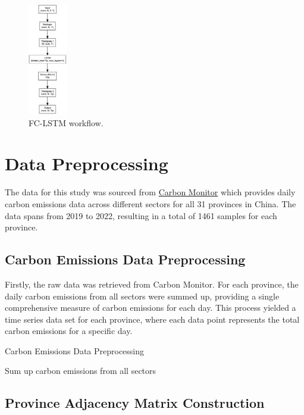 \documentclass[sigconf, authordraft]{acmart}
\begin{document}
	\begin{figure}[ht]
		\centering
		\includegraphics[width=0.15\textwidth]{figures/FC-LSTM_flow.png}
		\caption{FC-LSTM workflow.}
		\label{fig:FC-LSTM_flow}
	\end{figure}

	\section{Data Preprocessing}


	The data for this study was sourced from  \href{https://cn.carbonmonitor.org/}{Carbon Monitor} which provides daily carbon emissions data across different sectors for all 31
	provinces in China. The data spans from 2019 to 2022, resulting in a total of
	1461 samples for each province.

	\subsection{Carbon Emissions Data Preprocessing}


	Firstly, the raw data was retrieved from Carbon Monitor. For each province, the
	daily carbon emissions from all sectors were summed up, providing a single
	comprehensive measure of carbon emissions for each day. This process yielded a
	time series data set for each province, where each data point represents the
	total carbon emissions for a specific day.

	\begin{algorithm}
		\caption{Carbon Emissions Data Preprocessing}
		\begin{algorithmic}[1]
				\State Sum up carbon emissions from all sectors
			\EndFor
		\EndFor
		\end{algorithmic}
		\end{algorithm}

	\subsection{Province Adjacency Matrix Construction}
\end{document}
